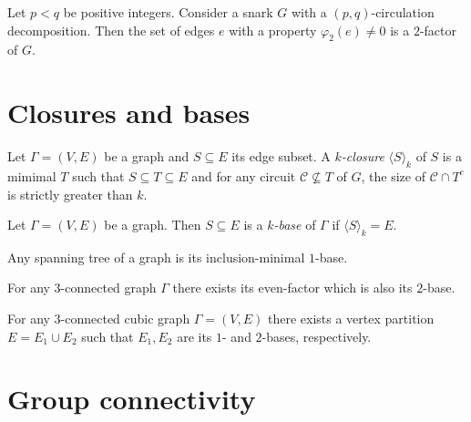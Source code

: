 \begin{lemma}
	Let $p<q$ be positive integers. Consider a snark $G$ with a $(p,q)$-circulation decomposition. Then the set of edges $e$ with a property $\varphi_2(e)\neq 0$ is a $2$-factor of $G$.\label{lem:2_circ_snark_2_factor}
\end{lemma}

\section{Closures and bases}

\begin{definition} \cite[p. 132]{seymour}
	Let $\Gamma=(V,E)$ be a graph and $S\subseteq E$ its edge subset. A \emph{$k$-closure} $\langle S\rangle_{k}$ of $S$ is a mimimal $T$ such that $S\subseteq T\subseteq E$ and for any circuit $\mathcal C\not\subseteq T$ of $G$, the size of $\mathcal C\cap T^c$ is strictly greater than $k$.
\end{definition}

\begin{definition} \cite[p. 7]{group_connectivity_enumeration}
	Let $\Gamma=(V,E)$ be a graph. Then $S\subseteq E$ is a \emph{$k$-base} of $\Gamma$ if $\langle S\rangle_k = E$.
\end{definition}

\begin{claim}
	Any spanning tree of a graph is its inclusion-minimal $1$-base.
\end{claim}

\begin{lemma} \cite[p. 133]{seymour}
	For any $3$-connected graph $\Gamma$ there exists its even-factor which is also its $2$-base.
\end{lemma}

\begin{lemma} \cite[p. 134]{seymour}
	For any $3$-connected cubic graph $\Gamma=(V,E)$ there exists a vertex partition $E=E_1\cup E_2$ such that $E_1,E_2$ are its $1$- and $2$-bases, respectively.
\end{lemma}

\section{Group connectivity}




